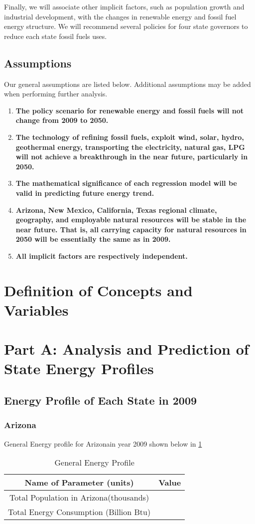 \documentclass{mcmthesis}
\def\az{Arizona}
\begin{document}
Finally, we will associate other implicit factors, such as population growth and industrial development, with the changes in renewable energy and fossil fuel energy structure. We will recommend several policies for four state governors to reduce each state fossil fuels uses.


\subsection{Assumptions}
Our general assumptions are listed below. Additional assumptions may be added when performing further analysis.

\begin{enumerate}[1]
\item \textbf{The policy scenario for renewable energy and fossil fuels will not change from 2009 to 2050.}
\item \textbf{The technology of refining fossil fuels, exploit wind, solar, hydro, geothermal energy, transporting the electricity, natural gas, LPG will not achieve a breakthrough in the near future, particularly in 2050.}
\item \textbf{The mathematical significance of each regression model will be valid in predicting future energy trend. }
\item \textbf{Arizona, New Mexico, California, Texas regional climate, geography, and employable natural resources will be stable in the near future. That is, all carrying capacity for natural resources in 2050 will be essentially the same as in 2009. }
\item \textbf{All implicit factors are respectively independent.}
\end{enumerate}

\section{Definition of Concepts and Variables}

\section{Part A: Analysis and Prediction of State Energy Profiles}
\subsection{Energy Profile of Each State in 2009}
	\subsubsection{\az}
		General Energy profile for \az in year 2009 shown below in \ref{tab:data}\\
		\begin{table}[H]
  		\centering
			\begin{tabular}{c|c}
			Name of Parameter (units) & Value\\ \hline
			Total Population in \az (thousands) & \\
			Total Energy Consumption (Billion Btu) & \\ %
			\end{tabular}
			\caption{General Energy Profile}
			\label{tab:data}
		 \end{table}
\end{document}
